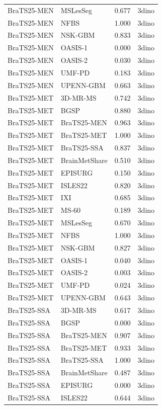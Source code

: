 \begin{tabular}{llrl}
BraTS25-MEN & MSLesSeg & 0.677 & 3dino \\
BraTS25-MEN & NFBS & 1.000 & 3dino \\
BraTS25-MEN & NSK-GBM & 0.833 & 3dino \\
BraTS25-MEN & OASIS-1 & 0.000 & 3dino \\
BraTS25-MEN & OASIS-2 & 0.030 & 3dino \\
BraTS25-MEN & UMF-PD & 0.183 & 3dino \\
BraTS25-MEN & UPENN-GBM & 0.663 & 3dino \\
BraTS25-MET & 3D-MR-MS & 0.742 & 3dino \\
BraTS25-MET & BGSP & 0.880 & 3dino \\
BraTS25-MET & BraTS25-MEN & 0.963 & 3dino \\
BraTS25-MET & BraTS25-MET & 1.000 & 3dino \\
BraTS25-MET & BraTS25-SSA & 0.837 & 3dino \\
BraTS25-MET & BrainMetShare & 0.510 & 3dino \\
BraTS25-MET & EPISURG & 0.150 & 3dino \\
BraTS25-MET & ISLES22 & 0.820 & 3dino \\
BraTS25-MET & IXI & 0.685 & 3dino \\
BraTS25-MET & MS-60 & 0.189 & 3dino \\
BraTS25-MET & MSLesSeg & 0.670 & 3dino \\
BraTS25-MET & NFBS & 1.000 & 3dino \\
BraTS25-MET & NSK-GBM & 0.827 & 3dino \\
BraTS25-MET & OASIS-1 & 0.040 & 3dino \\
BraTS25-MET & OASIS-2 & 0.003 & 3dino \\
BraTS25-MET & UMF-PD & 0.024 & 3dino \\
BraTS25-MET & UPENN-GBM & 0.643 & 3dino \\
BraTS25-SSA & 3D-MR-MS & 0.617 & 3dino \\
BraTS25-SSA & BGSP & 0.000 & 3dino \\
BraTS25-SSA & BraTS25-MEN & 0.907 & 3dino \\
BraTS25-SSA & BraTS25-MET & 0.933 & 3dino \\
BraTS25-SSA & BraTS25-SSA & 1.000 & 3dino \\
BraTS25-SSA & BrainMetShare & 0.487 & 3dino \\
BraTS25-SSA & EPISURG & 0.000 & 3dino \\
BraTS25-SSA & ISLES22 & 0.644 & 3dino \\

\end{tabular}
